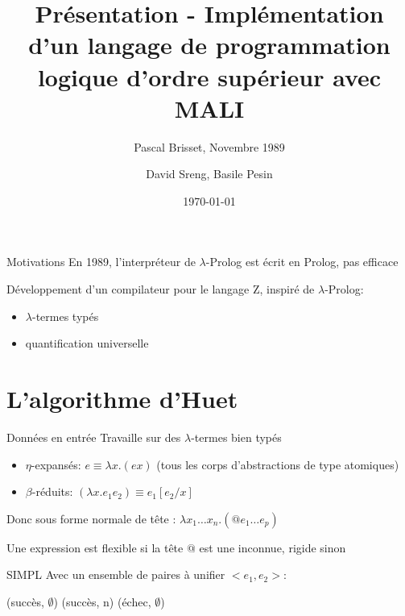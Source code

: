 \documentclass[aspectratio=169]{beamer}
\title{Présentation - Implémentation d’un langage de programmation logique d’ordre supérieur avec MALI}
\subtitle{Pascal Brisset, Novembre 1989}
\date{\today}
\author{David Sreng, Basile Pesin}
\institute{Faculté des Sciences de Sorbonne Université}
\begin{document}
\maketitle

\begin{frame}{Motivations}
  En 1989, l'interpréteur de $\lambda$-Prolog est écrit en Prolog, pas efficace

  Développement d'un compilateur pour le langage Z, inspiré de $\lambda$-Prolog:
  \begin{itemize}
    \item $\lambda$-termes typés
    \item quantification universelle
  \end{itemize}
\end{frame}

\section{L'algorithme d'Huet}

\begin{frame}{Données en entrée}
  Travaille sur des $\lambda$-termes bien typés
  \begin{itemize}
    \item $\eta$-expansés: $e \equiv \lambda x.(e x)$ (tous les corps d'abstractions de type atomiques)
    \item $\beta$-réduits: $(\lambda x . e_1 e_2) \equiv e_1[e_2/x]$
  \end{itemize}
  Donc sous forme normale de tête : $\lambda x_1 \ldots x_n . (@ e_1 \ldots e_p)$

  Une expression est flexible si la tête $@$ est une inconnue, rigide sinon
\end{frame}

\begin{frame}{SIMPL}
  Avec un ensemble de paires à unifier $<e_1, e_2>$:
  \begin{algorithmic}
     (succès, $\emptyset$)
    \EndIf
     (succès, n)
    \EndIf
     (échec, $\emptyset$)
    \Else
    \EndIf
    \EndIf
    \EndProcedure
  \end{algorithmic}
\end{frame}
\end{document}

